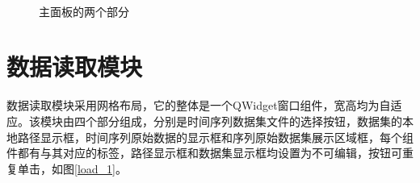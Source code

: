 \documentclass[cn,11pt,chinese]{elegantbook}
\begin{document}
\begin{figure}
	\centering
	\\
	\caption{主面板的两个部分}
	\label{main_window}
\end{figure}

\section{数据读取模块}

数据读取模块采用网格布局，它的整体是一个QWidget窗口组件，宽高均为自适应。该模块由四个部分组成，分别是时间序列数据集文件的选择按钮，数据集的本地路径显示框，时间序列原始数据的显示框和序列原始数据集展示区域框，每个组件都有与其对应的标签，路径显示框和数据集显示框均设置为不可编辑，按钮可重复单击，如图\ref{load_1}。
\end{document}
